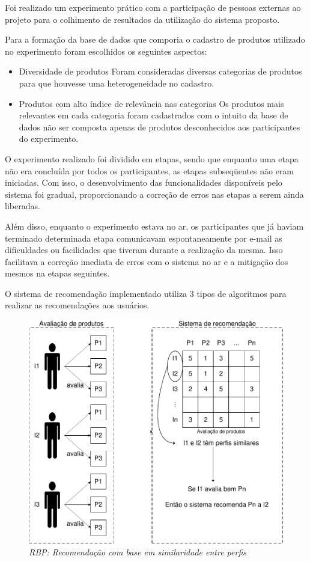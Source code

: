  Foi realizado um experimento prático com a participação de pessoas externas ao projeto para o colhimento de resultados da utilização do sistema proposto.

 Para a formação da base de dados que comporia o cadastro de produtos utilizado no experimento foram escolhidos os seguintes aspectos:

\begin{itemize}
	\item Diversidade de produtos
	\subitem Foram consideradas diversas categorias de produtos para que houvesse uma heterogeneidade no cadastro.
	\item Produtos com alto índice de relevância nas categorias
	\subitem Os produtos mais relevantes em cada categoria foram cadastrados com o intuito da base de dados não ser composta apenas de produtos desconhecidos aos participantes do experimento.
\end{itemize}

 O experimento realizado foi dividido em etapas, sendo que enquanto uma etapa não era concluída por todos os participantes, as etapas subseqüentes não eram iniciadas. Com isso, o desenvolvimento das funcionalidades disponíveis pelo sistema foi gradual, proporcionando a correção de erros nas etapas a serem ainda liberadas.

 Além disso, enquanto o experimento estava no ar, os participantes que já haviam terminado determinada etapa comunicavam espontaneamente por e-mail as dificuldades ou facilidades que tiveram durante a realização da mesma. Isso facilitava a correção imediata de erros com o sistema no ar e a mitigação dos mesmos na etapas seguintes.

 O sistema de recomendação implementado utiliza 3 tipos de algoritmos para realizar as recomendações aos usuários.

\begin{figure}
  \centering
  \includegraphics[width=\textwidth]{imagens/RBP}
  \caption{\it RBP: Recomendação com base em similaridade entre perfis}
  \label{fig:RBP}
\end{figure}

